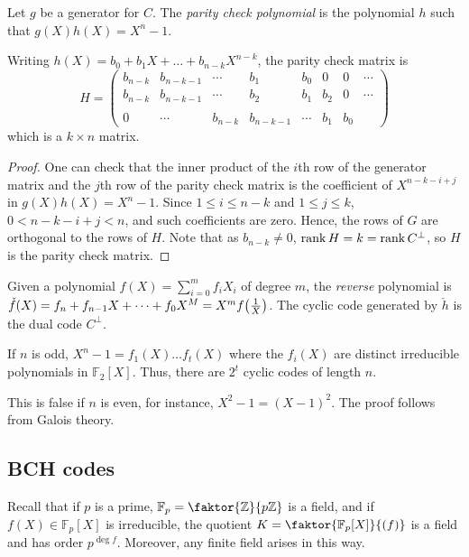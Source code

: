 \begin{definition}
    Let \( g \) be a generator for \( C \).
    The \emph{parity check polynomial} is the polynomial \( h \) such that \( g(X) h(X) = X^n - 1 \).
\end{definition}
\begin{corollary}
    Writing \( h(X) = b_0 + b_1 X + \dots + b_{n-k} X^{n-k} \), the parity check matrix is
    \[ H = \begin{pmatrix}
        b_{n-k} & b_{n-k-1} & \cdots & b_1 & b_0 & 0 & 0 & \cdots \\
        b_{n-k} & b_{n-k-1} & \cdots & b_2 & b_1 & b_2 & 0 & \cdots \\
        \\
        0 & \cdots & b_{n-k} & b_{n-k-1} & \cdots & b_1 & b_0
    \end{pmatrix} \]
    which is a \( k \times n \) matrix.
\end{corollary}
\begin{proof}
    One can check that the inner product of the \( i \)th row of the generator matrix and the \( j \)th row of the parity check matrix is the coefficient of \( X^{n-k-i+j} \) in \( g(X) h(X) = X^n - 1 \).
    Since \( 1 \leq i \leq n - k \) and \( 1 \leq j \leq k \), \( 0 < n - k - i + j < n \), and such coefficients are zero.
    Hence, the rows of \( G \) are orthogonal to the rows of \( H \).
    Note that as \( b_{n-k} \neq 0 \), \( \rank H = k = \rank C^\perp \), so \( H \) is the parity check matrix.
\end{proof}
\begin{remark}
    Given a polynomial \( f(X) = \sum_{i=0}^m f_i X_i \) of degree \( m \), the \emph{reverse} polynomial is \( \check{f}(X) = f_n + f_{n-1}X + \dots + f_0 X^M = X^m f\qty(\frac{1}{X}) \).
    The cyclic code generated by \( \check{h} \) is the dual code \( C^\perp \).
\end{remark}
\begin{lemma}
    If \( n \) is odd, \( X^n - 1 = f_1(X) \dots f_t(X) \) where the \( f_i(X) \) are distinct irreducible polynomials in \( \mathbb F_2[X] \).
    Thus, there are \( 2^t \) cyclic codes of length \( n \).
\end{lemma}
This is false if \( n \) is even, for instance, \( X^2 - 1 = (X - 1)^2 \).
The proof follows from Galois theory.

\subsection{BCH codes}
Recall that if \( p \) is a prime, \( \mathbb F_p = \faktor{\mathbb Z}{p\mathbb Z} \) is a field, and if \( f(X) \in \mathbb F_p[X] \) is irreducible, the quotient \( K = \faktor{\mathbb F_p[X]}{(f)} \) is a field and has order \( p^{\deg f} \).
Moreover, any finite field arises in this way.

